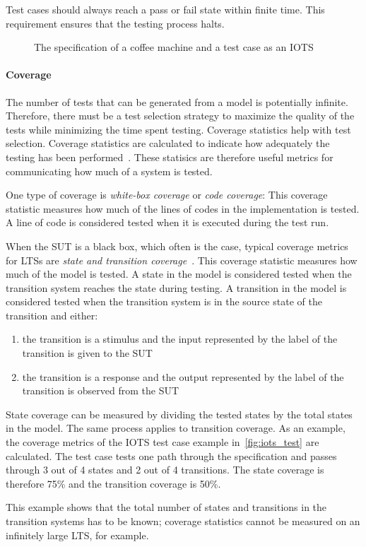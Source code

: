 Test cases should always reach a pass or fail state within finite time. This requirement ensures that the testing process halts.
\begin{figure}[ht]
  \begin{center}
    \subfloat[An IOTS]{\label{fig:iots_example}}
  \end{center}
  \caption{The specification of a coffee machine and a test case as an IOTS}
\end{figure}

\paragraph*{Coverage}\label{sec:coverage}
The number of tests that can be generated from a model is potentially infinite. Therefore, there must be a test selection strategy to maximize the quality of the tests while minimizing the time spent testing. Coverage statistics help with test selection. Coverage statistics are calculated to indicate how adequately the testing has been performed~\cite{Zhu:coverage}. These statisics are therefore useful metrics for communicating how much of a system is tested.

One type of coverage is \textit{white-box coverage} or \textit{code coverage}: This coverage statistic measures how much of the lines of codes in the implementation is tested. A line of code is considered tested when it is executed during the test run.

When the SUT is a black box, which often is the case, typical coverage metrics for LTSs are \textit{state and transition coverage}~\cite{Lee:testing, Nachmanson:testing, Hasan:testing}. This coverage statistic measures how much of the model is tested. A state in the model is considered tested when the transition system reaches the state during testing. A transition in the model is considered tested when the transition system is in the source state of the transition and either:
\begin{enumerate}
\item the transition is a stimulus and the input represented by the label of the transition is given to the SUT
\item the transition is a response and the output represented by the label of the transition is observed from the SUT
\end{enumerate}

 State coverage can be measured by dividing the tested states by the total states in the model. The same process applies to transition coverage. As an example, the coverage metrics of the IOTS test case example in~\ref{fig:iots_test} are calculated. The test case tests one path through the specification and passes through 3 out of 4 states and 2 out of 4 transitions. The state coverage is therefore 75\% and the transition coverage is 50\%.

 This example shows that the total number of states and transitions in the transition systems has to be known; coverage statistics cannot be measured on an infinitely large LTS, for example.


